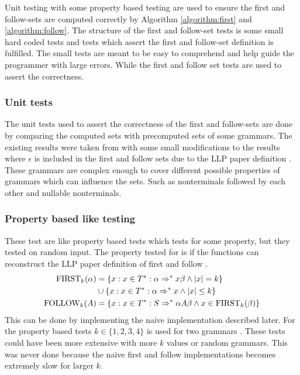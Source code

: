 Unit testing with some property based testing are used to ensure the first and follow-sets are computed correctly by Algorithm \ref{algorithm:first} and \ref{algorithm:follow}. The structure of the first and follow-set tests is some small hard coded tests and tests which assert the first and follow-set definition is fulfilled. The small tests are meant to be easy to comprehend and help guide the programmer with large errors. While the first and follow set tests are used to assert the correctness.

\subsubsection{Unit tests}
The unit tests used to assert the correctness of the first and follow-sets are done by comparing the computed sets with precomputed sets of some grammars. The existing results were taken from \cite[58, 62, 63, 65]{Mogensen} with some small modifications to the results where $\epsilon$ is included in the first and follow sets due to the LLP paper definition \cite[5]{Vagner2007}. These grammars are complex enough to cover different possible properties of grammars which can influence the sets. Such as nonterminals followed by each other and nullable nonterminals.

\subsubsection{Property based like testing}
These test are like property based tests which tests for some property, but they tested on random input. The property tested for is if the functions can reconstruct the LLP paper definition of first and follow \cite[5]{Vagner2007}.
\begin{align*}
    \text{FIRST}_k(\alpha) &= \{x : x \in T^* : \alpha \Rightarrow^* x \beta \land |x| = k\} \\ 
    \, &\cup \{x : x \in T^* : \alpha \Rightarrow^* x \land |x| \leq k\} \\
    \text{FOLLOW}_k(A) &= \{x : x \in T^* : S \Rightarrow^* \alpha A \beta \land x \in \text{FIRST}_k(\beta)\}
\end{align*}
This can be done by implementing the naive implementation described later. For the property based tests $k \in \{1, 2, 3, 4\}$ is used for two grammars \cite[62, 63]{Mogensen}. These tests could have been more extensive with more $k$ values or random grammars. This was never done because the naive first and follow implementations becomes extremely slow for larger $k$.


